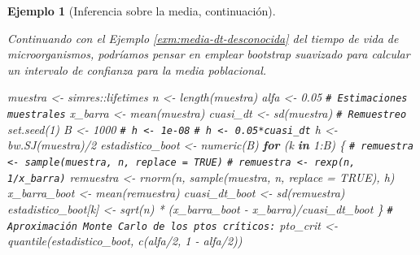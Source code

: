 \documentclass[
]{book}
\newenvironment{Shaded}{\begin{snugshade}}{\end{snugshade}}
\newcommand{\AttributeTok}[1]{\textcolor[rgb]{0.77,0.63,0.00}{#1}}
\newcommand{\CommentTok}[1]{\textcolor[rgb]{0.56,0.35,0.01}{\textit{#1}}}
\newcommand{\ConstantTok}[1]{\textcolor[rgb]{0.00,0.00,0.00}{#1}}
\newcommand{\ControlFlowTok}[1]{\textcolor[rgb]{0.13,0.29,0.53}{\textbf{#1}}}
\newcommand{\DecValTok}[1]{\textcolor[rgb]{0.00,0.00,0.81}{#1}}
\newcommand{\FloatTok}[1]{\textcolor[rgb]{0.00,0.00,0.81}{#1}}
\newcommand{\FunctionTok}[1]{\textcolor[rgb]{0.00,0.00,0.00}{#1}}
\newcommand{\NormalTok}[1]{#1}
\newcommand{\OtherTok}[1]{\textcolor[rgb]{0.56,0.35,0.01}{#1}}
\newcommand{\SpecialCharTok}[1]{\textcolor[rgb]{0.00,0.00,0.00}{#1}}
\theoremstyle{break}
\newtheorem{example}{Ejemplo}[chapter]
\theoremstyle{nonumberplain}
\renewcommand{\CommentTok}[1]{\textcolor[rgb]{0.41,0.41,0.41}{\texttt{#1}}}
\begin{document}
\begin{example}[Inferencia sobre la media, continuación]
\protect\hypertarget{exm:media-suav}{}\label{exm:media-suav}

Continuando con el Ejemplo \ref{exm:media-dt-desconocida} del tiempo de vida de microorganismos, podríamos pensar en emplear bootstrap suavizado para calcular un intervalo de confianza para la media poblacional.

\begin{Shaded}
\begin{Highlighting}[]
\NormalTok{muestra }\OtherTok{\textless{}{-}}\NormalTok{ simres}\SpecialCharTok{::}\NormalTok{lifetimes}
\NormalTok{n }\OtherTok{\textless{}{-}} \FunctionTok{length}\NormalTok{(muestra)}
\NormalTok{alfa }\OtherTok{\textless{}{-}} \FloatTok{0.05}
\CommentTok{\# Estimaciones muestrales}
\NormalTok{x\_barra }\OtherTok{\textless{}{-}} \FunctionTok{mean}\NormalTok{(muestra)}
\NormalTok{cuasi\_dt }\OtherTok{\textless{}{-}} \FunctionTok{sd}\NormalTok{(muestra)}
\CommentTok{\# Remuestreo}
\FunctionTok{set.seed}\NormalTok{(}\DecValTok{1}\NormalTok{)}
\NormalTok{B }\OtherTok{\textless{}{-}} \DecValTok{1000}
\CommentTok{\# h \textless{}{-} 1e{-}08}
\CommentTok{\# h \textless{}{-} 0.05*cuasi\_dt}
\NormalTok{h }\OtherTok{\textless{}{-}} \FunctionTok{bw.SJ}\NormalTok{(muestra)}\SpecialCharTok{/}\DecValTok{2}
\NormalTok{estadistico\_boot }\OtherTok{\textless{}{-}} \FunctionTok{numeric}\NormalTok{(B)}
\ControlFlowTok{for}\NormalTok{ (k }\ControlFlowTok{in} \DecValTok{1}\SpecialCharTok{:}\NormalTok{B) \{}
  \CommentTok{\# remuestra \textless{}{-} sample(muestra, n, replace = TRUE)}
  \CommentTok{\# remuestra \textless{}{-} rexp(n, 1/x\_barra)}
\NormalTok{  remuestra }\OtherTok{\textless{}{-}} \FunctionTok{rnorm}\NormalTok{(n, }\FunctionTok{sample}\NormalTok{(muestra, n, }\AttributeTok{replace =} \ConstantTok{TRUE}\NormalTok{), h)}
\NormalTok{  x\_barra\_boot }\OtherTok{\textless{}{-}} \FunctionTok{mean}\NormalTok{(remuestra)}
\NormalTok{  cuasi\_dt\_boot }\OtherTok{\textless{}{-}} \FunctionTok{sd}\NormalTok{(remuestra)}
\NormalTok{  estadistico\_boot[k] }\OtherTok{\textless{}{-}} \FunctionTok{sqrt}\NormalTok{(n) }\SpecialCharTok{*}\NormalTok{ (x\_barra\_boot }\SpecialCharTok{{-}}\NormalTok{ x\_barra)}\SpecialCharTok{/}\NormalTok{cuasi\_dt\_boot}
\NormalTok{\}}
\CommentTok{\# Aproximación Monte Carlo de los ptos críticos:}
\NormalTok{pto\_crit }\OtherTok{\textless{}{-}} \FunctionTok{quantile}\NormalTok{(estadistico\_boot, }\FunctionTok{c}\NormalTok{(alfa}\SpecialCharTok{/}\DecValTok{2}\NormalTok{, }\DecValTok{1} \SpecialCharTok{{-}}\NormalTok{ alfa}\SpecialCharTok{/}\DecValTok{2}\NormalTok{))}

\end{Highlighting}
\end{Shaded}
\end{example}
\end{document}
